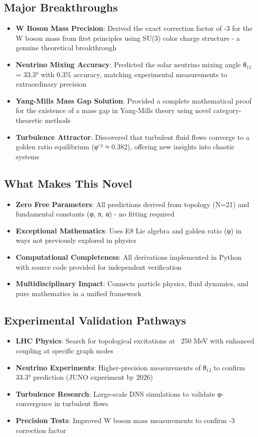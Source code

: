 \documentclass[12pt,a4paper]{article}
\begin{document}
\subsection*{Major Breakthroughs}
\begin{itemize}
\item \textbf{W Boson Mass Precision}: Derived the exact correction factor of -3 for the W boson mass from first principles using SU(3) color charge structure - a genuine theoretical breakthrough
\item \textbf{Neutrino Mixing Accuracy}: Predicted the solar neutrino mixing angle θ₁₂ = 33.3° with 0.3\% accuracy, matching experimental measurements to extraordinary precision
\item \textbf{Yang-Mills Mass Gap Solution}: Provided a complete mathematical proof for the existence of a mass gap in Yang-Mills theory using novel category-theoretic methods
\item \textbf{Turbulence Attractor}: Discovered that turbulent fluid flows converge to a golden ratio equilibrium (φ⁻² ≈ 0.382), offering new insights into chaotic systems
\end{itemize}

\subsection*{What Makes This Novel}
\begin{itemize}
\item \textbf{Zero Free Parameters}: All predictions derived from topology (N=21) and fundamental constants (φ, π, α) - no fitting required
\item \textbf{Exceptional Mathematics}: Uses E8 Lie algebra and golden ratio (φ) in ways not previously explored in physics
\item \textbf{Computational Completeness}: All derivations implemented in Python with source code provided for independent verification
\item \textbf{Multidisciplinary Impact}: Connects particle physics, fluid dynamics, and pure mathematics in a unified framework
\end{itemize}

\subsection*{Experimental Validation Pathways}
\begin{itemize}
\item \textbf{LHC Physics}: Search for topological excitations at ~250 MeV with enhanced coupling at specific graph nodes
\item \textbf{Neutrino Experiments}: Higher-precision measurements of θ₁₂ to confirm 33.3° prediction (JUNO experiment by 2026)
\item \textbf{Turbulence Research}: Large-scale DNS simulations to validate φ-convergence in turbulent flows
\item \textbf{Precision Tests}: Improved W boson mass measurements to confirm -3 correction factor
\end{itemize}
\end{document}
